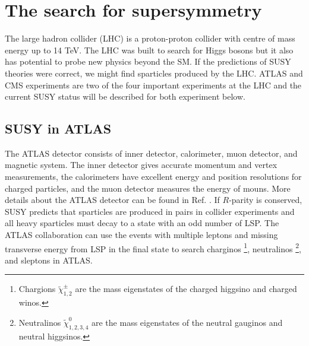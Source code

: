 \documentclass[12pt]{report}
\begin{document}
\chapter{The search for supersymmetry}

The large hadron collider (LHC) is a proton-proton collider with centre of mass energy up to 14 TeV.
The LHC was built to search for Higgs bosons but it also has potential to probe new physics beyond the SM.
If the predictions of SUSY theories were correct, we might find sparticles produced by the LHC.
ATLAS and CMS experiments are two of the four important experiments at the LHC and the current SUSY status will be described for both experiment below.



\section{SUSY in ATLAS}
The ATLAS detector consists of inner detector, calorimeter, muon detector, and magnetic system.
The inner detector gives accurate momentum and vertex measurements, the calorimeters have excellent energy and position resolutions for charged particles, and the muon detector measures the energy of mouns. %
More details about the ATLAS detector can be found in Ref. \cite{atlas_detector}.
If $R$-parity is conserved, SUSY predicts that sparticles are produced in pairs in collider experiments and all heavy sparticles must decay to a state with an odd number of LSP.
The ATLAS collaboration can use the events with multiple leptons and missing transverse energy from LSP in the final state to search charginos \footnote{Chargions $\widetilde{\chi}^{\pm}_{1, 2}$ are the mass eigenstates of the charged higgsino and charged winos.}, neutralinos \footnote{Neutralinos $\widetilde{\chi}^{0}_{1,2,3,4}$ are the mass eigenstates of the neutral gauginos and neutral higgsinos.}, and sleptons in ATLAS.
\end{document}
